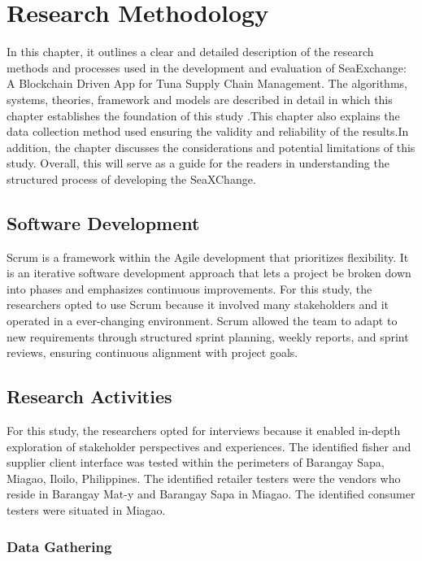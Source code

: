 \chapter{Research Methodology}
In this chapter, it outlines a clear and detailed description of the research methods and processes used in the development and evaluation of SeaExchange: A Blockchain Driven App for Tuna Supply Chain Management. The algorithms, systems, theories, framework and models are described in detail in which this chapter establishes the foundation of this study .This chapter also explains the data collection method used ensuring the validity and reliability of the results.In addition, the chapter discusses the considerations and potential limitations of this study. Overall, this will serve as a guide for the readers in understanding the structured process of developing the SeaXChange.

\section{Software Development}
Scrum is a framework within the Agile development that prioritizes flexibility. It is an iterative software development approach that lets a project be broken down into phases and emphasizes continuous improvements. For this study, the researchers opted to use Scrum  because it involved many stakeholders and it operated in a ever-changing environment. Scrum allowed the team to adapt to new requirements through structured sprint planning, weekly reports, and sprint reviews, ensuring continuous alignment with project goals.
\section{Research Activities}
For this study, the researchers opted for interviews because it enabled in-depth exploration of stakeholder perspectives and experiences. 
The identified fisher and supplier client interface was tested within the perimeters of Barangay Sapa, Miagao, Iloilo, Philippines. The identified retailer testers were the vendors who reside in Barangay Mat-y and Barangay Sapa in Miagao. The identified consumer testers were situated in Miagao. 

\subsection{Data Gathering}

